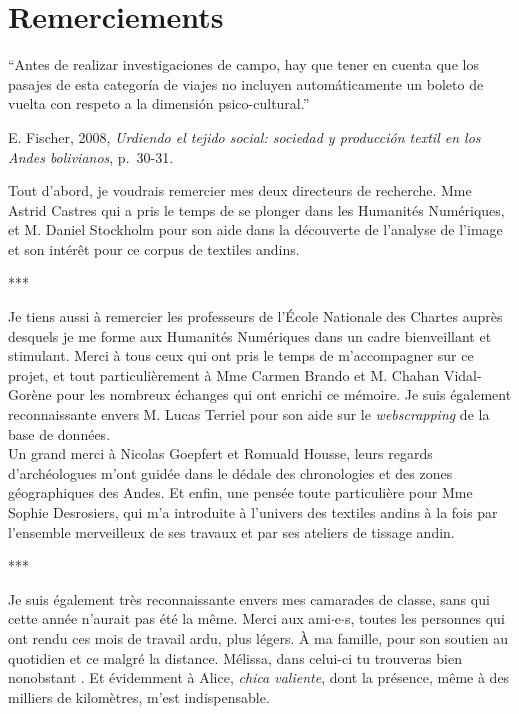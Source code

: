 \documentclass[a4paper, twoside]{book}
\newcommand{\inclusives}[1]{$\cdot${#1}$\cdot${s}}
\begin{document}
\clearpage
\thispagestyle{empty}
\cleardoublepage

\section*{Remerciements}

\epigraph{\textquotedblleft Antes de realizar investigaciones de campo, hay que tener en cuenta que los pasajes de esta categoría de viajes no incluyen automáticamente un boleto de vuelta con respeto a la dimensión psico-cultural.\textquotedblright}{E. Fischer, 2008, \textit{Urdiendo el tejido social: sociedad y producción textil en los Andes bolivianos}, p.~30-31.}

\vspace{30pt}

	Tout d'abord, je voudrais remercier mes deux directeurs de recherche. Mme Astrid Castres qui a pris le temps de se plonger dans les Humanités Numériques, et M. Daniel Stockholm pour son aide dans la découverte de l'analyse de l'image et son intérêt pour ce corpus de textiles andins.
    
\begin{center}
   ***
\end{center}

	Je tiens aussi à remercier les professeurs de l'École Nationale des Chartes auprès desquels je me forme aux Humanités Numériques dans un cadre bienveillant et stimulant. Merci à tous ceux qui ont pris le temps de m'accompagner sur ce projet, et tout particulièrement à Mme Carmen Brando et M. Chahan Vidal-Gorène pour les nombreux échanges qui ont enrichi ce mémoire. Je suis également reconnaissante envers M. Lucas Terriel pour son aide sur le \textit{webscrapping} de la base de données. \\
	
	Un grand merci à Nicolas Goepfert et Romuald Housse, leurs regards d'archéologues m'ont guidée dans le dédale des chronologies et des zones géographiques des Andes. Et enfin, une pensée toute particulière pour Mme Sophie Desrosiers, qui m'a introduite à l'univers des textiles andins à la fois par l'ensemble merveilleux de ses travaux et par ses ateliers de tissage andin.

\begin{center}
   ***
\end{center}

Je suis également très reconnaissante envers mes camarades de classe, sans qui cette année n'aurait pas été la même. Merci aux ami\inclusives{e}, toutes les personnes qui ont rendu ces mois de travail ardu, plus légers. À ma famille, pour son soutien au quotidien et ce malgré la distance. Mélissa, dans celui-ci tu trouveras bien \og nonobstant \fg. Et évidemment à Alice, \textit{chica valiente}, dont la présence, même à des milliers de kilomètres, m'est indispensable.
\end{document}
